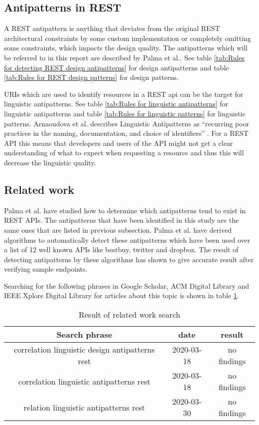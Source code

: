 \documentclass[a4paper,12pt]{article}
\begin{document}
\subsection{Antipatterns in REST}

A REST antipattern is anything that deviates from the original REST architectural constraints by some custom implementation or completely omitting some constraints, which impacts the design quality. The antipatterns which will be referred to in this report are described by Palma et al.\cite{linguistic}\cite{design}. See table \ref{tab:Rules for detecting REST design antipatterns} for design antipatterns and table \ref{tab:Rules for REST design patterns} for design patterns.

URIs which are used to identify resources in a REST api can be the target for linguistic antipatterns. See table \ref{tab:Rules for linguistic antipatterns} for linguistic antipatterns and table \ref{tab:Rules for linguistic patterns} for linguistic patterns. Arnaoudova et al. describes Linguistic Antipatterns as “recurring poor practices in the naming, documentation, and choice of identifiers” \cite{arnaoudova}. For a REST API this means that developers and users of the API might not get a clear understanding of what to expect when requesting a resource and thus this will decrease the linguistic quality. 

\subsection{Related work}
Palma et al. \cite{design} have studied how to determine which antipatterns tend to exist in REST APIs. The antipatterns that have been identified in this study are the same ones that are listed in previous subsection. Palma et al. \cite{design} have derived algorithms to automatically detect these antipatterns which have been used over a list of 12 well known APIs like bestbuy, twitter and dropbox. The result of detecting antipatterns by these algorithms has shown to give accurate result after verifying sample endpoints.

Searching for the following phrases in Google Scholar, ACM Digital Library and IEEE Xplore Digital Library for articles about this topic is shown in table \ref{tab:Result of related work search}.

\begin{center}
\begin{table}[!ht]
\begin{tabular}{| c | c | c |}
\hline \textbf{Search phrase} & \textbf{date} & \textbf{result} \\
\hline 
correlation linguistic design antipatterns rest &
2020-03-18 & 
no findings
\\ \hline
correlation linguistic antipatterns rest &
2020-03-18 &
no findings
\\ \hline
relation linguistic antipatterns rest &
2020-03-30 & 
no findings
\\ \hline
\end{tabular}
    \caption{Result of related work search}
    \label{tab:Result of related work search}
\end{table}
\end{center}
\end{document}

